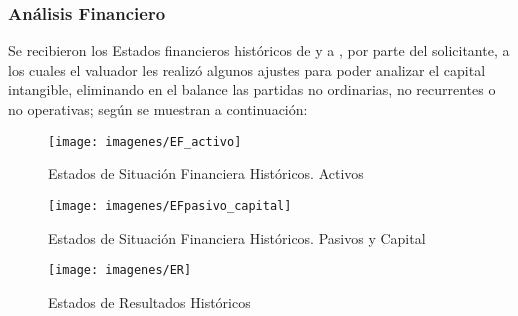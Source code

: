 \subsubsection{An\'alisis Financiero}

Se recibieron los Estados financieros hist\'oricos de \EFde{} y a \EFhasta, por parte del  solicitante,  a los cuales el valuador les realiz\'o algunos ajustes para poder analizar el capital intangible, eliminando en el balance las partidas no ordinarias, no recurrentes o no operativas; seg\'un se muestran a continuaci\'on:

\begin{figure}[H]
\centering
\caption{Estados de Situaci\'on Financiera Hist\'oricos. Activos \EFdeHasta \label{fig:ESF}}
\texttt{[image: imagenes/EF\_activo]}\\[5pt]

\end{figure}
\begin{figure}[H]
\centering
\caption{Estados de Situaci\'on Financiera Hist\'oricos. Pasivos y Capital \EFdeHasta \label{fig:ESF_2}}
\texttt{[image: imagenes/EFpasivo\_capital]}\\

\end{figure}

\begin{figure}[H]
\centering
\caption{Estados de Resultados Hist\'oricos \EFdeHasta \label{fig:ESF_3}}
\texttt{[image: imagenes/ER]}\\
\end{figure}

